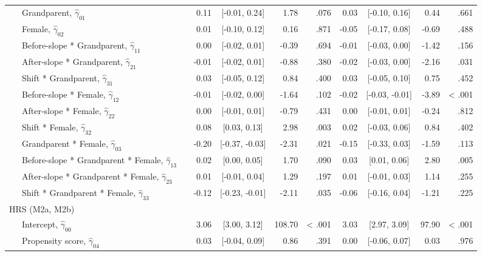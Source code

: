 \documentclass[
  english,
  man, noextraspace]{apa7}
\newenvironment{lltable}{\begin{landscape}\begin{center}\begin{ThreePartTable}}{\end{ThreePartTable}\end{center}\end{landscape}}
\begin{document}
\begin{lltable}
{\begin{longtable}{lrcrrrcrr}
\ \ \ Grandparent, $\hat{\gamma}_{01}$ \textcolor{white}{L} & 0.11 & [-0.01, 0.24] & 1.78 & .076 & 0.03 & [-0.10, 0.16] & 0.44 & .661\\
\ \ \ Female, $\hat{\gamma}_{02}$ \textcolor{white}{L} & 0.01 & [-0.10, 0.12] & 0.16 & .871 & -0.05 & [-0.17, 0.08] & -0.69 & .488\\
\ \ \ Before-slope * Grandparent, $\hat{\gamma}_{11}$ \textcolor{white}{L} & 0.00 & [-0.02, 0.01] & -0.39 & .694 & -0.01 & [-0.03, 0.00] & -1.42 & .156\\
\ \ \ After-slope * Grandparent, $\hat{\gamma}_{21}$ \textcolor{white}{L} & -0.01 & [-0.02, 0.01] & -0.88 & .380 & -0.02 & [-0.03, 0.00] & -2.16 & .031\\
\ \ \ Shift * Grandparent, $\hat{\gamma}_{31}$ \textcolor{white}{L} & 0.03 & [-0.05, 0.12] & 0.84 & .400 & 0.03 & [-0.05, 0.10] & 0.75 & .452\\
\ \ \ Before-slope * Female, $\hat{\gamma}_{12}$ \textcolor{white}{L} & -0.01 & [-0.02, 0.00] & -1.64 & .102 & -0.02 & [-0.03, -0.01] & -3.89 & < .001\\
\ \ \ After-slope * Female, $\hat{\gamma}_{22}$ \textcolor{white}{L} & 0.00 & [-0.01, 0.01] & -0.79 & .431 & 0.00 & [-0.01, 0.01] & -0.24 & .812\\
\ \ \ Shift * Female, $\hat{\gamma}_{32}$ \textcolor{white}{L} & 0.08 & [0.03, 0.13] & 2.98 & .003 & 0.02 & [-0.03, 0.06] & 0.84 & .402\\
\ \ \ Grandparent * Female, $\hat{\gamma}_{03}$ \textcolor{white}{L} & -0.20 & [-0.37, -0.03] & -2.31 & .021 & -0.15 & [-0.33, 0.03] & -1.59 & .113\\
\ \ \ Before-slope * Grandparent * Female, $\hat{\gamma}_{13}$ \textcolor{white}{L} & 0.02 & [0.00, 0.05] & 1.70 & .090 & 0.03 & [0.01, 0.06] & 2.80 & .005\\
\ \ \ After-slope * Grandparent * Female, $\hat{\gamma}_{23}$ \textcolor{white}{L} & 0.01 & [-0.01, 0.04] & 1.29 & .197 & 0.01 & [-0.01, 0.03] & 1.14 & .255\\
\ \ \ Shift * Grandparent * Female, $\hat{\gamma}_{33}$ \textcolor{white}{L} & -0.12 & [-0.23, -0.01] & -2.11 & .035 & -0.06 & [-0.16, 0.04] & -1.21 & .225\\
HRS (M2a, M2b) &  &  &  &  &  &  &  & \\
\ \ \ Intercept, $\hat{\gamma}_{00}$ \textcolor{white}{H} & 3.06 & [3.00, 3.12] & 108.70 & < .001 & 3.03 & [2.97, 3.09] & 97.90 & < .001\\
\ \ \ Propensity score, $\hat{\gamma}_{04}$ \textcolor{white}{H} & 0.03 & [-0.04, 0.09] & 0.86 & .391 & 0.00 & [-0.06, 0.07] & 0.03 & .976\\

\end{longtable}}
\end{lltable}
\end{document}

